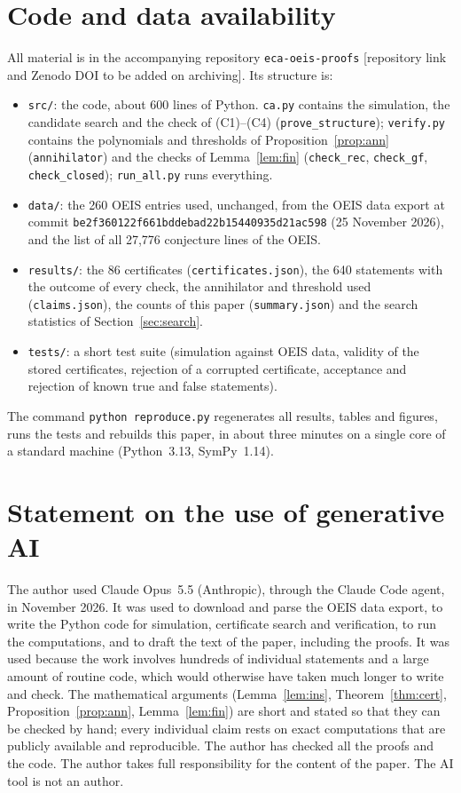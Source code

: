 \documentclass[11pt]{article}
\theoremstyle{definition}
\theoremstyle{remark}
\begin{document}
\section*{Code and data availability}
All material is in the accompanying repository \texttt{eca-oeis-proofs} [repository link and Zenodo DOI to be added on archiving]. Its structure is:
\begin{itemize}
\item \texttt{src/}: the code, about 600 lines of Python. \texttt{ca.py} contains the simulation, the candidate search and the check of (C1)--(C4) (\texttt{prove\_structure}); \texttt{verify.py} contains the polynomials and thresholds of Proposition~\ref{prop:ann} (\texttt{annihilator}) and the checks of Lemma~\ref{lem:fin} (\texttt{check\_rec}, \texttt{check\_gf}, \texttt{check\_closed}); \texttt{run\_all.py} runs everything.
\item \texttt{data/}: the 260 OEIS entries used, unchanged, from the OEIS data export at commit \texttt{be2f360122f661bddebad22b15440935d21ac598} (25 November 2026), and the list of all 27{,}776 conjecture lines of the OEIS.
\item \texttt{results/}: the 86 certificates (\texttt{certificates.json}), the 640 statements with the outcome of every check, the annihilator and threshold used (\texttt{claims.json}), the counts of this paper (\texttt{summary.json}) and the search statistics of Section~\ref{sec:search}.
\item \texttt{tests/}: a short test suite (simulation against OEIS data, validity of the stored certificates, rejection of a corrupted certificate, acceptance and rejection of known true and false statements).
\end{itemize}
The command \texttt{python reproduce.py} regenerates all results, tables and figures, runs the tests and rebuilds this paper, in about three minutes on a single core of a standard machine (Python~3.13, SymPy~1.14).

\section*{Statement on the use of generative AI}
The author used Claude Opus~5.5 (Anthropic), through the Claude Code agent, in November 2026. It was used to download and parse the OEIS data export, to write the Python code for simulation, certificate search and verification, to run the computations, and to draft the text of the paper, including the proofs. It was used because the work involves hundreds of individual statements and a large amount of routine code, which would otherwise have taken much longer to write and check. The mathematical arguments (Lemma~\ref{lem:ins}, Theorem~\ref{thm:cert}, Proposition~\ref{prop:ann}, Lemma~\ref{lem:fin}) are short and stated so that they can be checked by hand; every individual claim rests on exact computations that are publicly available and reproducible. The author has checked all the proofs and the code. The author takes full responsibility for the content of the paper. The AI tool is not an author.
\end{document}
